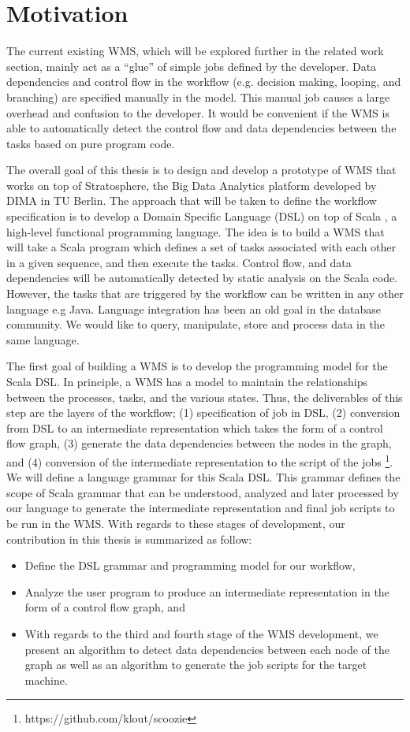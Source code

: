 \section{Motivation}
The current existing WMS, which will be explored further in the related work section, mainly act as a “glue” of simple jobs defined by the developer. Data dependencies and control flow in the workflow (e.g. decision making, looping, and branching) are specified manually in the model. This manual job causes a large overhead and confusion to the developer. It would be convenient if the WMS is able to automatically detect the control flow and data dependencies between the tasks based on pure program code. 

The overall goal of this thesis is to design and develop a prototype of WMS that works on top of Stratosphere, the Big Data Analytics platform developed by DIMA in TU Berlin. The approach that will be taken to define the workflow specification is to develop a Domain Specific Language (DSL) \cite{van2000domain} on top of Scala \cite{odersky2004overview}, a high-level functional programming language. The idea is to build a WMS that will take a Scala program which defines a set of tasks associated with each other in a given sequence, and then execute the tasks. Control flow, and data dependencies will be automatically detected by static analysis on the Scala code. However, the tasks that are triggered by the workflow can be written in any other language e.g Java. Language integration has been an old goal in the database community. We would like to query, manipulate, store and process data in the same language. 

The first goal of building a WMS is to develop the programming model for the Scala DSL. In principle, a WMS has a model to maintain the relationships between the processes, tasks, and the various states. Thus, the deliverables of this step are the layers of the workflow; (1) specification of job in DSL, (2) conversion from DSL to an intermediate representation which takes the form of a control flow graph, (3) generate the data dependencies between the nodes in the graph, and (4) conversion of the intermediate representation to the script of the jobs \footnote{\label{scoozie}https://github.com/klout/scoozie}. We will define a language grammar for this Scala DSL. This grammar defines the scope of Scala grammar \cite{odersky2004scala} that can be understood, analyzed and later processed by our language  to generate the intermediate representation and final job scripts to be run in the WMS. With regards to these stages of development, our contribution in this thesis is summarized as follow:
\begin{itemize}
\item Define the DSL grammar and programming model for our workflow,
\item Analyze the user program to produce an intermediate representation in the form of a control flow graph, and 
\item With regards to the third and fourth stage of the WMS development, we present an algorithm to detect data dependencies between each node of the graph as well as an algorithm to generate the job scripts for the target machine. 
\end{itemize}

